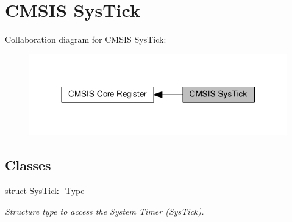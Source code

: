\hypertarget{group___c_m_s_i_s___sys_tick}{}\section{C\+M\+S\+IS Sys\+Tick}
\label{group___c_m_s_i_s___sys_tick}
Collaboration diagram for C\+M\+S\+IS Sys\+Tick\+:\nopagebreak
\begin{figure}[H]
\begin{center}
\leavevmode
\includegraphics[width=317pt]{group___c_m_s_i_s___sys_tick}
\end{center}
\end{figure}
\subsection*{Classes}
\begin{DoxyCompactItemize}
\item 
struct \hyperlink{struct_sys_tick___type}{Sys\+Tick\+\_\+\+Type}
\begin{DoxyCompactList}\small\item\em Structure type to access the System Timer (Sys\+Tick). \end{DoxyCompactList}\end{DoxyCompactItemize}
